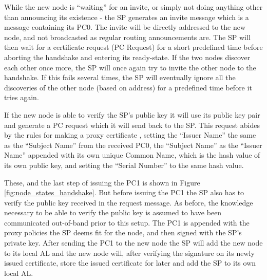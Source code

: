 
While the new node is ``waiting'' for an invite, or simply not doing anything
other than announcing its existence - the \ac{SP} generates an invite message
which is a message containing its \ac{PC0}. The invite will be directly
addressed to the new node, and not broadcasted as regular routing announcements
are. The \ac{SP} will then wait for a certificate request (\ac{PC} Request) for
a short predefined time before aborting the handshake and entering its
ready-state. If the two nodes discover each other once more, the \ac{SP} will
once again try to invite the other node to the handshake. If this fails several
times, the \ac{SP} will eventually ignore all the discoveries of the other node
(based on address) for a predefined time before it tries again.

If the new node is able to verify the SP's public key it will use its public
key pair and generate a \ac{PC} request which it will send back to the \ac{SP}.
This request abides by the rules for making a proxy certificate \cite{rfc3820},
setting the ``Issuer Name'' the same as the ``Subject Name'' from the received
\ac{PC0}, the ``Subject Name'' as the ``Issuer Name'' appended with its own
unique Common Name, which is the hash value of its own public key, and setting
the ``Serial Number'' to the same hash value.

These, and the last step of issuing the \ac{PC1} is shown in Figure
\ref{fig:node_states_handshake}. But before issuing the \ac{PC1} the \ac{SP}
also has to verify the public key received in the request message. As before,
the knowledge necessary to be able to verify the public key is assumed to have been
communicated out-of-band prior to this setup. The \ac{PC1} is appended with the
proxy policies the \ac{SP} deems fit for the node, and then signed with the
\ac{SP}'s private key. After sending the \ac{PC1} to the new node the \ac{SP}
will add the new node to its local \ac{AL} and the new node will, after
verifying the signature on its newly issued certificate, store the issued
certificate for later and add the \ac{SP} to its own local \ac{AL}.

